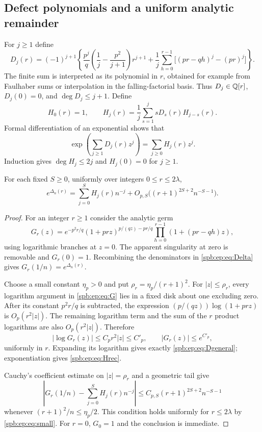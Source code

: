 \subsection{Defect polynomials and a uniform analytic remainder}
For $j\ge1$ define
\begin{equation}\label{spb:ep:eq:Dgeneral}
 D_j(r)=(-1)^{j+1}\left\{
  \frac{p^j}{q}\left(\frac1j-\frac{p^2}{j+1}\right)r^{j+1}
  +\frac1j\sum_{h=0}^{r-1}\bigl[(pr-qh)^j-(pr)^j\bigr]\right\}.
\end{equation}
The finite sum is interpreted as its polynomial in $r$, obtained for
example from Faulhaber sums or interpolation in the falling-factorial
basis. Thus $D_j\in\mathbb Q[r]$, $D_j(0)=0$, and
$\deg D_j\le j+1$.
Define
\begin{equation}\label{spb:ep:eq:Hrec}
 H_0(r)=1,\qquad
 H_j(r)=\frac1j\sum_{s=1}^j sD_s(r)H_{j-s}(r).
\end{equation}
Formal differentiation of an exponential shows that
\[
 \exp\left(\sum_{j\ge1}D_j(r)z^j\right)
        =\sum_{j\ge0}H_j(r)z^j.
\]
Induction gives $\deg H_j\le2j$ and $H_j(0)=0$ for $j\ge1$.

\begin{lemma}\label{spb:ep:lem:cauchy}
For each fixed $S\ge0$, uniformly over integers $0\le r\le2\lambda$,
\begin{equation}\label{spb:ep:eq:pointrem}
 e^{\Delta_n(r)}=\sum_{j=0}^S H_j(r)n^{-j}
       +O_{p,S}\bigl((r+1)^{2S+2}n^{-S-1}\bigr).
\end{equation}
\end{lemma}
\begin{proof}
For an integer $r\ge1$ consider the analytic germ
\begin{equation}\label{spb:ep:eq:G}
 G_r(z)=e^{-p^2r/q}
       (1+prz)^{p/(qz)-pr/q}
       \prod_{h=0}^{r-1}(1+(pr-qh)z),
\end{equation}
using logarithmic branches at $z=0$. The apparent singularity at zero is
removable and $G_r(0)=1$. Recombining the denominators in
\eqref{spb:ep:eq:Delta} gives $G_r(1/n)=e^{\Delta_n(r)}$.

Choose a small constant $\eta_p>0$ and put
$\rho_r=\eta_p/(r+1)^2$. For $|z|\le\rho_r$, every logarithm argument in
\eqref{spb:ep:eq:G} lies in a fixed disk about one excluding zero. After its
constant $p^2r/q$ is subtracted, the expression
$(p/(qz))\log(1+prz)$ is $O_p(r^2|z|)$.
The remaining logarithm term and the sum of the $r$ product logarithms
are also $O_p(r^2|z|)$. Therefore
\[
 |\log G_r(z)|\le C_p r^2|z|\le C'_p,
 \qquad |G_r(z)|\le e^{C'_p},
\]
uniformly in $r$.
Expanding its logarithm gives exactly \eqref{spb:ep:eq:Dgeneral}; exponentiation
gives \eqref{spb:ep:eq:Hrec}.

Cauchy's coefficient estimate on $|z|=\rho_r$ and a geometric tail give
\[
 \left|G_r(1/n)-\sum_{j=0}^S H_j(r)n^{-j}\right|
  \le C_{p,S}(r+1)^{2S+2}n^{-S-1}
\]
whenever $(r+1)^2/n\le\eta_p/2$.
This condition holds uniformly for $r\le2\lambda$ by \eqref{spb:ep:eq:small}.
For $r=0$, $G_0=1$ and the conclusion is immediate.
\end{proof}

